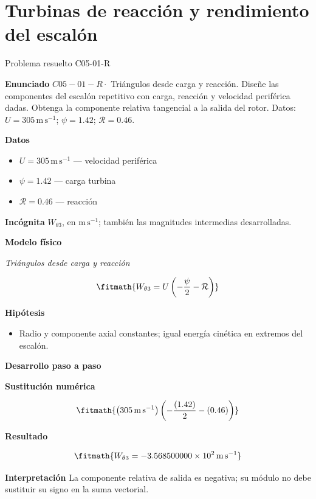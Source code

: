 \documentclass[10pt,openany]{book}
\begin{document}
\chapter{Turbinas de reacción y rendimiento del escalón}
\begin{studiumworked}{Problema resuelto C05-01-R}


\noindent\textbf{Enunciado}
\(C05-01-R \cdot\) Triángulos desde carga y reacción. Diseñe las componentes del escalón repetitivo con carga, reacción y velocidad periférica dadas. Obtenga la componente relativa tangencial a la salida del rotor. Datos: \(U=305\, \mathrm{m}\,\mathrm{s}^{-1}\); \(\psi=1.42\); \(\mathcal R=0.46\).

\noindent\textbf{Datos}
\begin{itemize}
\item $U = 305\,\mathrm{m}\,\mathrm{s}^{-1}$ — velocidad periférica
\item $\psi = 1.42$ — carga turbina
\item $\mathcal R = 0.46$ — reacción
\end{itemize}

\noindent\textbf{Incógnita}
$W_{\theta 3}$, en $\mathrm{m\,s^{-1}}$; también las magnitudes intermedias desarrolladas.

\noindent\textbf{Modelo físico}

\noindent\textit{Triángulos desde carga y reacción}

\[
\fitmath{W_{\theta 3}=U \left(- \frac{\psi}{2} - \mathcal R\right)}
\]

\noindent\textbf{Hipótesis}
\begin{itemize}
\item Radio y componente axial constantes; igual energía cinética en extremos del escalón.
\end{itemize}

\noindent\textbf{Desarrollo paso a paso}



\noindent\textbf{Sustitución numérica}

\[
\fitmath{\left(305\,\mathrm{m}\,\mathrm{s}^{-1}\right) \left(- \frac{\left(1.42\right)}{2} - \left(0.46\right)\right)}
\]

\noindent\textbf{Resultado}

\[
\fitmath{W_{\theta 3}=-3.568500000\times10^{2}\,\mathrm{m}\,\mathrm{s}^{-1}}
\]

\noindent\textbf{Interpretación}
La componente relativa de salida es negativa; su módulo no debe sustituir su signo en la suma vectorial.


\end{studiumworked}
\end{document}
